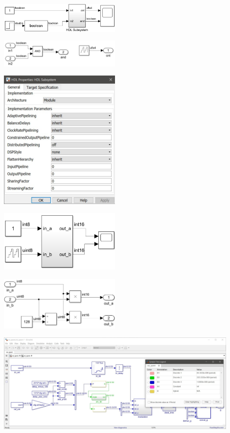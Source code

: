 \begin{page}%
	\includegraphics[width=6cm]{fig4.jpg}%
\end{page}

\begin{page}%
	\includegraphics[width=6cm]{fig5.jpg}%
\end{page}

\begin{page}%
	\includegraphics[width=6cm]{fig6.jpg}%
\end{page}

\begin{page}%
	\includegraphics[width=6cm]{fig7.jpg}%
\end{page}

\begin{page}%
	\includegraphics[width=6cm]{fig8.jpg}%
\end{page}

\begin{page}%
	\includegraphics[width=12cm]{fig9.jpg}%
\end{page}


